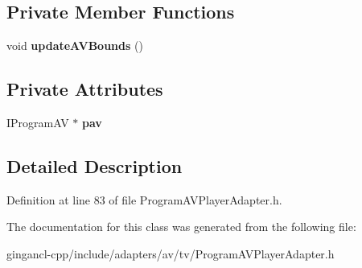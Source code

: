 \subsection*{Private Member Functions}
\begin{CompactItemize}
\item 
void \textbf{updateAVBounds} ()\label{classbr_1_1pucrio_1_1telemidia_1_1ginga_1_1ncl_1_1adapters_1_1av_1_1tv_1_1ProgramAVPlayerAdapter_8012ed17b82c719a41f86d20269bd0cf}

\end{CompactItemize}
\subsection*{Private Attributes}
\begin{CompactItemize}
\item 
IProgramAV $\ast$ {\bf pav}\label{classbr_1_1pucrio_1_1telemidia_1_1ginga_1_1ncl_1_1adapters_1_1av_1_1tv_1_1ProgramAVPlayerAdapter_387a5f3d8817d39e709c42a7091e089c}

\end{CompactItemize}


\subsection{Detailed Description}




Definition at line 83 of file ProgramAVPlayerAdapter.h.

The documentation for this class was generated from the following file:\begin{CompactItemize}
\item 
gingancl-cpp/include/adapters/av/tv/ProgramAVPlayerAdapter.h\end{CompactItemize}
